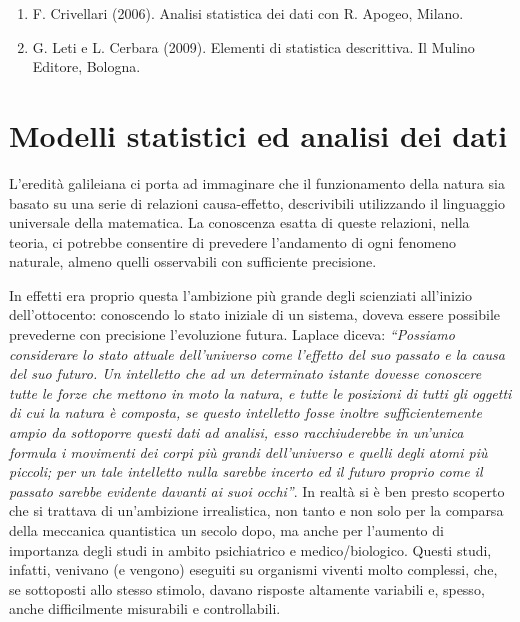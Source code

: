 \documentclass[a4paper,12pt,oneside]{book}
\providecommand{\tightlist}{%
  \setlength{\itemsep}{0pt}\setlength{\parskip}{0pt}}
\begin{document}
\begin{enumerate}
\def\labelenumi{\arabic{enumi}.}
\tightlist
\item
  F. Crivellari (2006). Analisi statistica dei dati con R. Apogeo, Milano.
\item
  G. Leti e L. Cerbara (2009). Elementi di statistica descrittiva. Il Mulino Editore, Bologna.
\end{enumerate}

\hypertarget{modelli-statistici-ed-analisi-dei-dati}{%
\chapter{Modelli statistici ed analisi dei dati}\label{modelli-statistici-ed-analisi-dei-dati}}

L'eredità galileiana ci porta ad immaginare che il funzionamento della natura sia basato su una serie di relazioni causa-effetto, descrivibili utilizzando il linguaggio universale della matematica. La conoscenza esatta di queste relazioni, nella teoria, ci potrebbe consentire di prevedere l'andamento di ogni fenomeno naturale, almeno quelli osservabili con sufficiente precisione.

In effetti era proprio questa l'ambizione più grande degli scienziati all'inizio dell'ottocento: conoscendo lo stato iniziale di un sistema, doveva essere possibile prevederne con precisione l'evoluzione futura. Laplace diceva: \emph{``Possiamo considerare lo stato attuale dell'universo come l'effetto del suo passato e la causa del suo futuro. Un intelletto che ad un determinato istante dovesse conoscere tutte le forze che mettono in moto la natura, e tutte le posizioni di tutti gli oggetti di cui la natura è composta, se questo intelletto fosse inoltre sufficientemente ampio da sottoporre questi dati ad analisi, esso racchiuderebbe in un'unica formula i movimenti dei corpi più grandi dell'universo e quelli degli atomi più piccoli; per un tale intelletto nulla sarebbe incerto ed il futuro proprio come il passato sarebbe evidente davanti ai suoi occhi''}. In realtà si è ben presto scoperto che si trattava di un'ambizione irrealistica, non tanto e non solo per la comparsa della meccanica quantistica un secolo dopo, ma anche per l'aumento di importanza degli studi in ambito psichiatrico e medico/biologico. Questi studi, infatti, venivano (e vengono) eseguiti su organismi viventi molto complessi, che, se sottoposti allo stesso stimolo, davano risposte altamente variabili e, spesso, anche difficilmente misurabili e controllabili.
\end{document}
